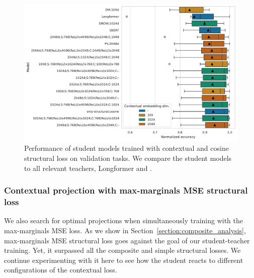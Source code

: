 \begin{figure}

  \includegraphics[width=\textwidth]{img/projections_contextual_cos.pdf}

  \caption{Performance of student models trained with contextual and cosine
  structural loss on validation tasks. We compare the student models to all
  relevant teachers, Longformer and .}

  \label{fig:cos_projections_contextual}

\end{figure}

\subsubsection{Contextual projection with max-marginals MSE structural
loss}\label{section:projections_mm_mse}

We also search for optimal projections when simultaneously training with the
max-marginals MSE loss. As we show in
Section~\ref{section:composite_analysis}, max-marginals MSE structural loss
goes against the goal of our student-teacher training. Yet, it surpassed all the
composite and simple structural losses. We continue experimenting with it
here to see how the student reacts to different configurations of the contextual loss.

